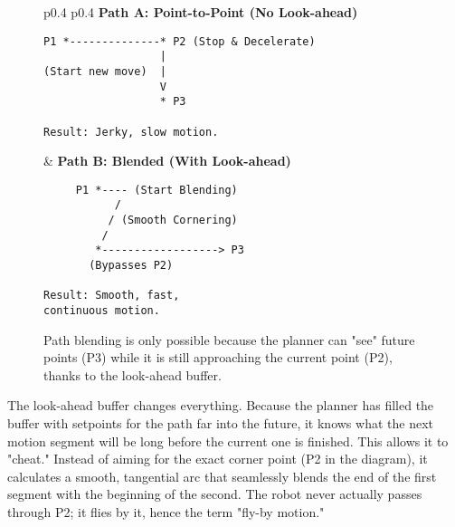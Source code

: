 \begin{figure}[htbp!]
    \centering
    \begin{tcolorbox}[
        width=\textwidth,
        sharp corners,
        title=Comparing Point-to-Point vs. Blended Motion,
        fonttitle=\bfseries
    ]
    \begin{tabular}{p{} p{}}
        \textbf{Path A: Point-to-Point (No Look-ahead)}
        \begin{verbatim}
P1 *--------------* P2 (Stop & Decelerate)
                  |
(Start new move)  | 
                  V
                  * P3

Result: Jerky, slow motion.
        \end{verbatim}
        &
        \textbf{Path B: Blended (With Look-ahead)}
        \begin{verbatim}
     P1 *---- (Start Blending)
           /
          / (Smooth Cornering)
         /
        *------------------> P3
       (Bypasses P2)
       
Result: Smooth, fast, 
continuous motion.
        \end{verbatim}
    \end{tabular}
    \end{tcolorbox}
    \caption{Path blending is only possible because the planner can "see" future points (P3) while it is still approaching the current point (P2), thanks to the look-ahead buffer.}
    \label{fig:path_blending}
\end{figure}

The look-ahead buffer changes everything. Because the planner has filled the buffer with setpoints for the path far into the future, it knows what the next motion segment will be long before the current one is finished. This allows it to "cheat." Instead of aiming for the exact corner point (P2 in the diagram), it calculates a smooth, tangential arc that seamlessly blends the end of the first segment with the beginning of the second. The robot never actually passes through P2; it flies by it, hence the term "fly-by motion."

